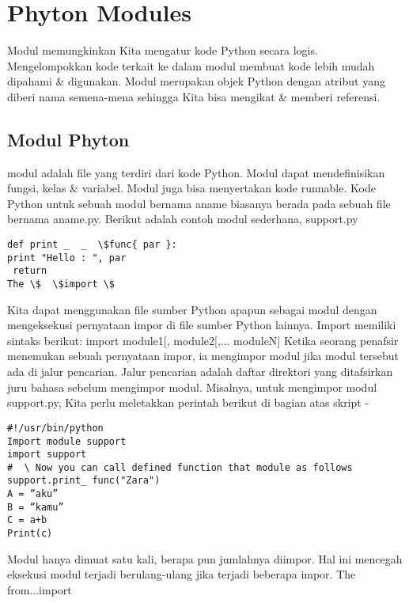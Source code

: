 
\section{Phyton Modules} 
Modul memungkinkan Kita mengatur kode Python secara logis. Mengelompokkan kode terkait ke dalam modul membuat kode lebih mudah dipahami \& digunakan. Modul merupakan objek Python dengan atribut yang diberi nama semena-mena sehingga Kita bisa mengikat \& memberi referensi.
\subsection{Modul Phyton}
modul adalah file yang terdiri dari kode Python. Modul dapat mendefinisikan fungsi, kelas \& variabel. Modul juga bisa menyertakan kode runnable.
Kode Python untuk sebuah modul bernama aname biasanya berada pada sebuah file bernama aname.py. Berikut adalah contoh modul sederhana, support.py  
\begin{verbatim}
def print _  _  \$func{ par }:  
print "Hello : ", par  
 return  
The \$  \$import \$
\end{verbatim}
Kita dapat menggunakan file sumber Python apapun sebagai modul dengan mengeksekusi pernyataan impor di file sumber Python lainnya. Import memiliki sintaks berikut:  
  import module1[, module2[,... moduleN]  
Ketika seorang penafsir menemukan sebuah pernyataan impor, ia mengimpor modul jika modul tersebut ada di jalur pencarian. Jalur pencarian adalah daftar direktori yang ditafsirkan juru bahasa sebelum mengimpor modul. Misalnya, untuk mengimpor modul support.py, Kita perlu meletakkan perintah berikut di bagian atas skript - 
 \begin{verbatim}
#!/usr/bin/python 
Import module support 
import support 
#  \ Now you can call defined function that module as follows 
support.print_ func("Zara")
A = “aku”
B = “kamu”
C = a+b
Print(c)
\end{verbatim}

Modul hanya dimuat satu kali, berapa pun jumlahnya diimpor. Hal ini mencegah eksekusi modul terjadi berulang-ulang jika terjadi beberapa impor. 
The from...import 


